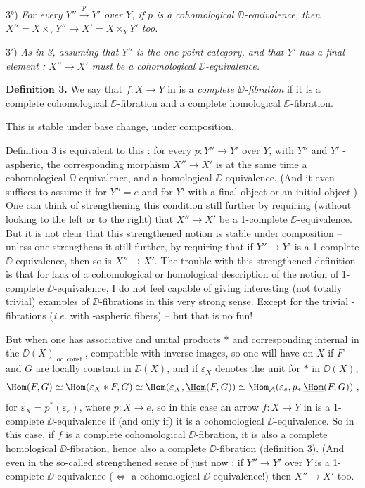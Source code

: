 3°) \textit{For every $Y'' \overset{p}{\to} Y'$ over $Y$, if $p$ is a cohomological $\DD$-equivalence, then $X'' = X \times_Y Y'' \longrightarrow X' = X \times_Y Y'$ too.}

3$'$) \textit{As in 3, assuming that $Y''$ is the one-point category, and that $Y'$ has a final element : $X'' \to X'$ must be a cohomological $\DD$-equivalence.}

\textbf{Definition 3.} We say that $f : X \to Y$ in \Dia{} is a \textit{complete $\DD$-fibration} if it is a complete cohomological $\DD$-fibration and a complete homological $\DD$-fibration.

This is stable under base change, under composition.

Definition 3 is equivalent to this : for every $p : Y'' \to Y'$ over $Y$, with $Y''$ and $Y'$ \Hot-aspheric, the corresponding morphism $X'' \to X'$ is \underline{at} \underline{the same} \underline{time} a cohomological $\DD$-equivalence, and a homological $\DD$-equivalence. (And it even suffices to assume it for $Y'' = e$ and for $Y'$ with a final object or an initial object.) One can think of strengthening this condition still further by requiring (without looking to the left or to the right) that $X'' \to X'$ be a 1-complete $\DD$-equivalence. But it is not clear that this strengthened notion is stable under composition – unless one strengthens it still further, by requiring that if $Y'' \to Y'$ is a 1-complete $\DD$-equivalence, then so is $X'' \to X'$. The trouble with this strengthened definition is that for lack of a cohomological or homological description of the notion of
1-complete $\DD$-equivalence, I do not feel capable of giving interesting (not totally trivial) examples of $\DD$-fibrations in this very strong sense. Except for the trivial \Hot-fibrations (\textit{i.e.} with \Hot-aspheric fibers) – but that is no fun!

But when one has associative and unital products $*$ and corresponding internal \underline{\Hom} in the $\DD(X)_{\mathrm{loc.\ const.}}$, compatible with inverse images, so one will have on $X$ if $F$ and $G$ are locally constant in $\DD(X)$, and if $\varepsilon_X$ denotes the unit for $*$ in $\DD(X)$,
\[
\Hom(F,G) \simeq \Hom(\varepsilon_X * F, G) \simeq \Hom(\varepsilon_X, \underline{\Hom}(F,G)) \simeq \Hom_{\mathcal{A}}(\varepsilon_e, p_*\, \underline{\Hom}(F,G)) \ ,
\]
for $\varepsilon_X = p^*(\varepsilon_e)$, where $p : X \to e$, so in this case an arrow $f : X \to Y$ in \Dia{} is a 1-complete $\DD$-equivalence if (and only if) it is a cohomological $\DD$-equivalence. So in this case, if $f$ is a complete cohomological $\DD$-fibration, it is also a complete homological $\DD$-fibration, hence also a complete $\DD$-fibration (definition 3). (And even in the so-called strengthened sense of just now : if $Y'' \to Y'$ over $Y$ is a 1-complete $\DD$-equivalence ($\Leftrightarrow$ a cohomological $\DD$-equivalence!) then $X'' \to X'$ too. %